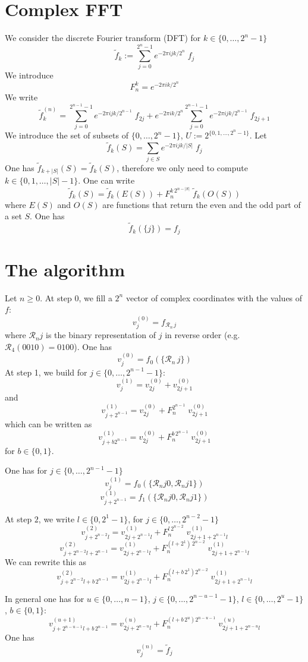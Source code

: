 \documentclass{article}
\begin{document}
\section{Complex FFT}
We consider the discrete Fourier transform (DFT) for $k\in\{0,\dots,2^n-1\}$
$$
\tilde{f}_{k} := \sum_{j=0}^{2^n-1} e^{-2\pi ijk/2^n} \;f_j
$$
We introduce
$$
F_n^k = e^{-2\pi i k/2^n}
$$
We write
$$
\tilde{f}_k^{(n)}= \sum_{j=0}^{2^{n-1}-1} e^{-2\pi ijk/2^{n-1}} \;f_{2j}+e^{-2\pi ik/2^n}\sum_{j=0}^{2^{n-1}-1} e^{-2\pi ijk/2^{n-1}} \;f_{2j+1}
$$
We introduce the set of subsets of $\{0,\dots, 2^{n}-1\}$, $U:=2^{\{0,1, \dots, 2^{n}-1\}}$. Let
$$
\tilde{f}_k(S)=\sum_{j\in S} e^{-2\pi i jk/|S|}\;f_j
$$
One has $\tilde{f}_{k+|S|}(S)= \tilde{f}_{k}(S)$, therefore we only need to compute $k\in \{0,1,\dots, |S|-1\}$. One can write
$$
\tilde{f}_k(S)= \tilde{f}_k(E(S)) + F_n^{k\, 2^{n-|S|}}\;\tilde{f}_k(O(S))
$$
where $E(S)$ and $O(S)$ are functions that return the even and the odd part of a set $S$.
One has
$$
\tilde{f}_k(\{j\}) = f_j
$$
\section{The algorithm}
Let $n \ge 0$. At step $0$, we fill a $2^n$ vector of complex coordinates with the values of $f$:
$$
v_j^{(0)} = f_{\mathcal{R}_n\,j}
$$
where $\mathcal{R}_nj$ is the binary representation of $j$ in reverse order (e.g. $\mathcal{R}_4(0010)= 0100$).
One has
$$
v_j^{(0)} = f_0(\{\mathcal{R}_n\,j\})
$$
At step 1, we build for $j\in \{0,\dots, 2^{n-1}-1\}$:
$$
v_j^{(1)}= v_{2j}^{(0)} + v_{2j+1}^{(0)}
$$
and
$$
v_{j+2^{n-1}}^{(1)} = v_{2j}^{(0)} + F_n^{2^{n-1}}\; v_{2j+1}^{(0)}
$$
which can be written as
$$
v_{j+b 2^{n-1}}^{(1)} = v_{2j}^{(0)} + F_n^{b\,2^{n-1}}\; v_{2j+1}^{(0)}
$$
for $b\in\{0, 1\}$.

One has for $j\in\{0,\dots, 2^{n-1}-1\}$
$$
v_{j}^{(1)}=f_0(\{\mathcal{R}_nj0,\mathcal{R}_nj1 \})
$$
$$
v_{j+2^{n-1}}^{(1)}=f_{1}(\{\mathcal{R}_nj0,\mathcal{R}_nj1 \})
$$

At step $2$, we write $l\in\{0, 2^1-1\}$, for $j\in \{0,\dots, 2^{n-2}-1\}$
$$
v_{j+2^{n-2}l}^{(2)}=v_{2j+2^{n-1}l}^{(1)}+F_n^{l\,2^{n-2}}\; v_{2j+1+2^{n-1}l}^{(1)}
$$
$$
v_{j+2^{n-2}l+2^{n-1}}^{(2)}=v_{2j+2^{n-1}l}^{(1)}+F_n^{(l+2^1)\,2^{n-2}}\; v_{2j+1+2^{n-1}l}^{(1)}
$$
We can rewrite this as
$$
v_{j+2^{n-2}l+b\,2^{n-1}}^{(2)}=v_{2j+2^{n-1}l}^{(1)}+F_n^{(l+b\,2^{1})2^{n-2}}\; v_{2j+1+2^{n-1}l}^{(1)}
$$


In general one has for $u\in\{0,\dots, n-1\}$, $j\in\{0, \dots, 2^{n-u-1}-1\}$, $l\in\{0,\dots, 2^{u}-1\}$, $b\in\{0, 1\}$:
$$
v_{j+2^{n-u-1}l+b\,2^{n-1}}^{(u+1)}=v_{2j+2^{n-u}l}^{(u)}+F_n^{(l+b\,2^{u})2^{n-u-1}}\; v_{2j+1+2^{n-u}l}^{(u)}
$$
One has
$$
v_{j}^{(n)} = \tilde{f}_{j}
$$
\end{document}
